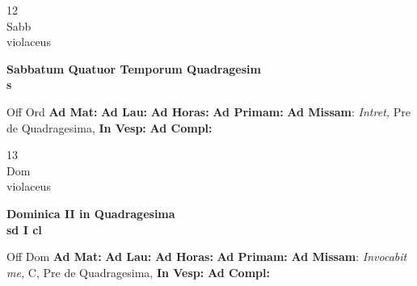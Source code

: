 \documentclass[10pt, openany]{book}
\begin{document}
    \begin{center}
        \begin{minipage}{3.5in}
            \vspace{2em}
            \begin{minipage}{0.5in}
                {\Huge 12} \\
                {\normalsize Sabb} \\
                {\normalsize violaceus}
            \end{minipage}
            \begin{minipage}{3.0in}
                \textbf{ \large Sabbatum Quatuor Temporum Quadragesim \\
                \textnormal{\normalsize s}} \\ 
            \end{minipage}
            \begin{justify}Off Ord
                \textbf{Ad Mat: }
                \textbf{Ad Lau: }
                \textbf{Ad Horas: }
                \textbf{Ad Primam: }\textbf{Ad Missam}: \textit{Intret,} Pre de Quadragesima,  
                \textbf{In Vesp: }
                \textbf{Ad Compl: }
            \end{justify}
        \end{minipage}
    \end{center}

    \begin{center}
        \begin{minipage}{3.5in}
            \vspace{2em}
            \begin{minipage}{0.5in}
                {\Huge 13} \\
                {\normalsize Dom} \\
                {\normalsize violaceus}
            \end{minipage}
            \begin{minipage}{3.0in}
                \textbf{ \large Dominica II in Quadragesima \\
                \textnormal{\normalsize sd I cl}} \\ 
            \end{minipage}
            \begin{justify}Off Dom
                \textbf{Ad Mat: }
                \textbf{Ad Lau: }
                \textbf{Ad Horas: }
                \textbf{Ad Primam: }\textbf{Ad Missam}: \textit{Invocabit me,} C, Pre de Quadragesima,  
                \textbf{In Vesp: }
                \textbf{Ad Compl: }
            \end{justify}
        \end{minipage}
    \end{center}
\end{document}

